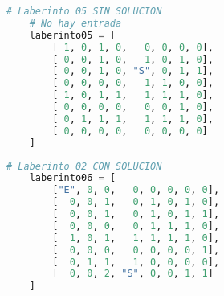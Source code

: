 \documentclass[a4paper,12pt]{article}
\begin{document}
\begin{minipage}[t]{8.2cm}
\begin{lstlisting}[style=mystylepython, language=Python, caption= laberinto05]
    # Laberinto 05 SIN SOLUCION
    # No hay entrada
    laberinto05 = [
        [ 1, 0, 1, 0,   0, 0, 0, 0],
        [ 0, 0, 1, 0,   1, 0, 1, 0],
        [ 0, 0, 1, 0, "S", 0, 1, 1],
        [ 0, 0, 0, 0,   1, 1, 0, 0],
        [ 1, 0, 1, 1,   1, 1, 1, 0],
        [ 0, 0, 0, 0,   0, 0, 1, 0],
        [ 0, 1, 1, 1,   1, 1, 1, 0],
        [ 0, 0, 0, 0,   0, 0, 0, 0]
    ]    
\end{lstlisting}
\end{minipage}
\hspace{9mm}
\begin{minipage}[t]{8.2cm}
\begin{lstlisting}[style=mystylepython, language=Python, caption= laberinto06]
    # Laberinto 02 CON SOLUCION
    laberinto06 = [
        ["E", 0, 0,   0, 0, 0, 0, 0],
        [  0, 0, 1,   0, 1, 0, 1, 0],
        [  0, 0, 1,   0, 1, 0, 1, 1],
        [  0, 0, 0,   0, 1, 1, 1, 0],
        [  1, 0, 1,   1, 1, 1, 1, 0],
        [  0, 0, 0,   0, 0, 0, 0, 1],
        [  0, 1, 1,   1, 0, 0, 0, 0],
        [  0, 0, 2, "S", 0, 0, 1, 1]
    ]
\end{lstlisting}
\end{minipage}


\newpage %
\thispagestyle{fancyref}
\printbibliography %
\end{document}
